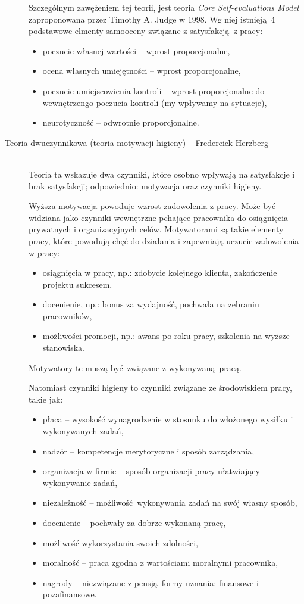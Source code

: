 \begin{description}
Szczególnym zawężeniem tej teorii, jest teoria \emph{Core Self-evaluations Model} zaproponowana przez Timothy A. Judge w 1998. Wg niej istnieją 4 podstawowe elmenty samooceny związane z satysfakcją z pracy:
\begin{itemize}
\item poczucie własnej wartości -- wprost proporcjonalne,
\item ocena własnych umiejętności -- wprost proporcjonalne,
\item poczucie umiejscowienia kontroli -- wprost proporcjonalne do wewnętrzengo poczucia kontroli (my wpływamy na sytuacje),
\item neurotyczność -- odwrotnie proporcjonalne.
\end{itemize}

\item[Teoria dwuczynnikowa (teoria motywacji-higieny) -- Fredereick Herzberg] \hfill \\
Teoria ta wskazuje dwa czynniki, które osobno wpływają na satysfakcje i brak satysfakcji; odpowiednio: motywacja oraz czynniki higieny. 

Wyższa motywacja powoduje wzrost zadowolenia z pracy. Może być widziana jako czynniki wewnętrzne pchające pracownika do osiągnięcia prywatnych i organizacyjnych celów. Motywatorami są takie elementy pracy, które powodują chęć do działania i zapewniają uczucie zadowolenia w pracy:
\begin{itemize}
\item osiągnięcia w pracy, np.: zdobycie kolejnego klienta, zakończenie projektu sukcesem,
\item docenienie, np.: bonus za wydajność, pochwała na zebraniu pracowników,
\item możliwości promocji, np.: awans po roku pracy, szkolenia na wyższe stanowiska.
\end{itemize}
Motywatory te muszą być związane z wykonywaną pracą.

Natomiast czynniki higieny to czynniki związane ze środowiskiem pracy, takie jak:
\begin{itemize}
\item płaca -- wysokość wynagrodzenie w stosunku do włożonego wysiłku i wykonywanych zadań, 
\item nadzór -- kompetencje merytoryczne i sposób zarządzania,
\item organizacja w firmie -- sposób organizacji pracy ułatwiający wykonywanie zadań, 
\item niezależność -- możliwość wykonywania zadań na swój własny sposób,
\item docenienie -- pochwały za dobrze wykonaną pracę,
\item możliwość wykorzystania swoich zdolności,
\item moralność -- praca zgodna z wartościami moralnymi pracownika,
\item nagrody -- niezwiązane z pensją formy uznania: finansowe i pozafinansowe.
\end{itemize}


\end{description}
